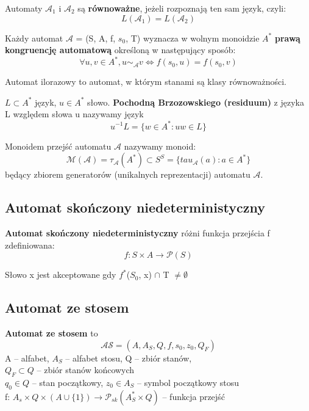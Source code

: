 \documentclass[main.tex]{subfiles}
\begin{document}
    \begin{definition}
        Automaty $\mathcal{A}_{1}$ i  $\mathcal{A}_{2}$ są \textbf{równoważne}, jeżeli rozpoznają ten sam język, czyli:
        \[L(\mathcal{A}_{1}) = L(\mathcal{A}_{2})\]
    \end{definition}

    \begin{definition}
        Każdy automat $\mathcal{A}$ = (S, A, f, $s_{0}$, T) wyznacza w wolnym monoidzie $A^{*}$ \textbf{prawą kongruencję
        automatową} określoną w następujący sposób:
        \[\forall u,v \in A^{*}, u \sim_\mathcal{A} v \Leftrightarrow f(s_{0}, u) = f(s_{0}, v)\]

        Automat ilorazowy to automat, w którym stanami są klasy równoważności.
    \end{definition}

    \begin{definition}
        $L \subset  A^{*}$ język, $u \in A^{*}$ słowo.
        \textbf{Pochodną Brzozowskiego (residuum)} z języka L względem słowa u nazywamy język
        \[u^{-1}L = \{w \in A^{*}  : uw \in L \}\]
    \end{definition}

    \begin{definition}
        Monoidem przejść automatu $\mathcal{A}$ nazywamy monoid:
        \[\mathcal{M(A)} = \tau_\mathcal{A}(A^*) \subset S^{S} = \{tau_\mathcal{A}(a) : a \in A^*\}\]
        będący zbiorem generatorów (unikalnych reprezentacji) automatu $\mathcal{A}$.
    \end{definition}

    \subsection{Automat skończony niedeterministyczny}
    \begin{definition}
        \textbf{Automat skończony niedeterministyczny} różni funkcja przejścia f zdefiniowana:
        \[f : S \times A \rightarrow \mathcal{P} (S) \]

        Słowo x jest akceptowane gdy $f^{*}$($S_{0}$, x) $\cap$ T $\neq \emptyset$
    \end{definition}

    \subsection{Automat ze stosem}
    \begin{definition}
        \textbf{Automat ze stosem} to
        \[\mathcal{AS} = (A, A_{S}, Q, f, s_{0}, z_{0}, Q_{F})\]
        A -- alfabet, $A_{S}$ -- alfabet stosu, Q -- zbiór stanów,\\
        $Q_{F} \subset Q$ -- zbiór stanów końcowych\\
        $q_{0} \in Q$ -- stan początkowy, $z_{0} \in A_{S}$ -- symbol początkowy stosu\\
        f: $A_{s} \times Q \times (A \cup \{1\}) \rightarrow \mathcal{P}_{sk}(A^{*}_{S} \times Q)$ -- funkcja przejść
    \end{definition}
\end{document}
